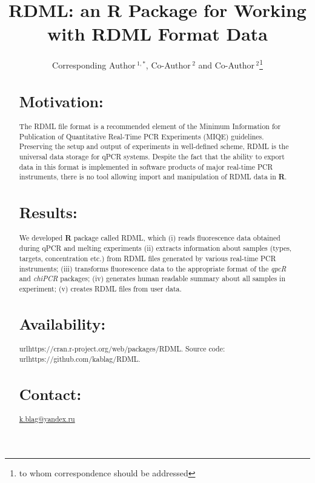 \documentclass{bioinfo}
\begin{document}
	
	\title[RDML]{RDML: an \textbf{R} Package for Working with RDML Format Data}
	\author[Sample \textit{et~al}]{Corresponding Author\,$^{1,*}$, Co-Author\,$^{2}$
		and Co-Author\,$^2$\footnote{to whom correspondence should be addressed}}
	\address{$^{1}$Department of XXXXXXX, Address XXXX etc.\\ $^{2}$Department of
		XXXXXXXX, Address XXXX etc.}
	
	
	
	\maketitle
	
	\begin{abstract}
		
		\section{Motivation:} The RDML file format is a recommended element of the
		Minimum Information for Publication of Quantitative Real-Time PCR Experiments
		(MIQE) guidelines. Preserving the setup and output of experiments in
		well-defined scheme, RDML is the universal data storage for qPCR systems.
		Despite the fact that the ability to export data in this format is implemented
		in software products of major real-time PCR instruments, there is no tool
		allowing import and manipulation of RDML data in \textbf{R}.
		
		\section{Results:} We developed \textbf{R} package called RDML, which (i) reads
		fluorescence data obtained during qPCR and melting experiments (ii) extracts
		information about samples (types, targets, concentration etc.) from RDML files
		generated by various real-time PCR instruments; (iii) transforms fluorescence
		data to the appropriate format of the \textit{qpcR} and \textit{chiPCR}
		packages; (iv) generates human readable summary about all samples in experiment;
		(v) creates RDML files from user data. \section{Availability:}
		url{https://cran.r-project.org/web/packages/RDML}. Source code:
		url{https://github.com/kablag/RDML}. \section{Contact:}
		\href{k.blag@yandex.ru}{k.blag@yandex.ru} \end{abstract}
	
\end{document}
